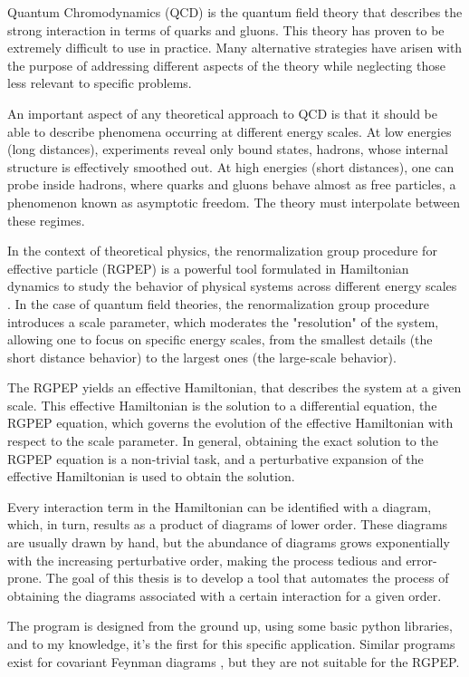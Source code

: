 \documentclass[11pt,a4paper,twoside,pdf]{article}
\numberwithin{equation}{section}
\begin{document}
Quantum Chromodynamics (QCD) is the quantum field theory that describes the strong interaction
in terms of quarks and gluons. This theory has proven to be extremely difficult to use in practice.
Many alternative strategies have arisen with the purpose of addressing different aspects
of the theory while neglecting those less relevant to specific problems.

An important aspect of any theoretical approach to QCD is that it should be able to describe  
phenomena occurring at different energy scales. At low energies (long distances), experiments reveal only bound states,
hadrons, whose internal structure is effectively smoothed out. At high energies 
(short distances), one can probe inside hadrons, where quarks and gluons behave almost as 
free particles, a phenomenon known as asymptotic freedom. The theory must interpolate between these regimes.

In the context of theoretical physics, the renormalization group procedure 
for effective particle (RGPEP) is a powerful tool formulated in Hamiltonian dynamics
to study the behavior of physical systems across different energy scales \cite{PhysRevD.48.5863}.
In the case of quantum field theories, 
the renormalization 
group procedure introduces a scale parameter, which moderates the "resolution" of the 
system, allowing one to focus on specific energy scales, from 
the smallest details (the short distance behavior) to the largest ones (the large-scale behavior). 

The RGPEP yields an effective Hamiltonian, that describes the system at a
given scale. This effective Hamiltonian is the solution to a differential equation,
the RGPEP equation, which governs the evolution of the effective Hamiltonian with 
respect to the scale parameter. In general, obtaining the exact solution to the RGPEP equation is a non-trivial task, 
and a perturbative expansion of the effective Hamiltonian is used to obtain the 
solution. \cite{QCDG}

Every interaction term in the Hamiltonian can be identified with a 
diagram, which, in turn, results as a product of diagrams of lower order.
These diagrams are usually drawn by hand, but the abundance of diagrams grows exponentially with 
the increasing perturbative order, making the process 
tedious and error-prone. The goal of this thesis is to develop a tool that automates 
the process of obtaining the diagrams associated with a certain interaction for a 
given order.

The program is designed from the ground up, using some basic python libraries, and
to my knowledge, it's the first for this specific application. Similar programs exist for
covariant Feynman diagrams \cite{Alwall:2014hca, Huber:2019dkb}, 
but they are not suitable for the RGPEP.
\end{document}
